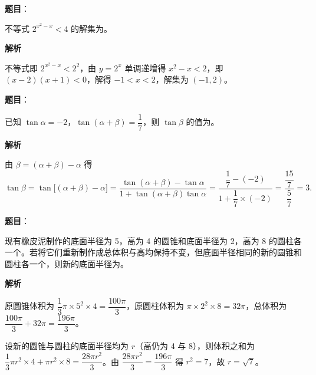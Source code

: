 \begin{answer}

\textbf{题目}：

不等式 \(2^{x^{2}-x}<4\) 的解集为\gkblank{}。

\textbf{解析}

不等式即 \(2^{x^{2}-x}<2^{2}\)，由 \(y=2^{x}\) 单调递增得 \(x^{2}-x<2\)，即 \((x-2)(x+1)<0\)，解得 \(-1<x<2\)，解集为 \((-1,2)\)。


\end{answer}
\begin{answer}

\textbf{题目}：

已知 \(\tan\alpha=-2\)，\(\tan(\alpha+\beta)=\dfrac{1}{7}\)，则 \(\tan\beta\) 的值为\gkblank{}。

\textbf{解析}

由 \(\beta=(\alpha+\beta)-\alpha\) 得
\nopagebreak[4]
\[
\tan\beta=\tan\bigl[(\alpha+\beta)-\alpha\bigr]=\frac{\tan(\alpha+\beta)-\tan\alpha}{1+\tan(\alpha+\beta)\tan\alpha}
=\frac{\dfrac{1}{7}-(-2)}{1+\dfrac{1}{7}\times(-2)}
=\frac{\dfrac{15}{7}}{\dfrac{5}{7}}=3.
\]


\end{answer}
\begin{answer}

\textbf{题目}：

现有橡皮泥制作的底面半径为 5，高为 4 的圆锥和底面半径为 2，高为 8 的圆柱各一个。若将它们重新制作成总体积与高均保持不变，但底面半径相同的新的圆锥和圆柱各一个，则新的底面半径为\gkblank{}。

\textbf{解析}

原圆锥体积为 \(\dfrac{1}{3}\pi\times5^{2}\times4=\dfrac{100\pi}{3}\)，原圆柱体积为 \(\pi\times2^{2}\times8=32\pi\)，总体积为 \(\dfrac{100\pi}{3}+32\pi=\dfrac{196\pi}{3}\)。

设新的圆锥与圆柱的底面半径均为 \(r\)（高仍为 4 与 8），则体积之和为 \(\dfrac{1}{3}\pi r^{2}\times4+\pi r^{2}\times8=\dfrac{28\pi r^{2}}{3}\)。由 \(\dfrac{28\pi r^{2}}{3}=\dfrac{196\pi}{3}\) 得 \(r^{2}=7\)，故 \(r=\sqrt{7}\)。


\end{answer}
